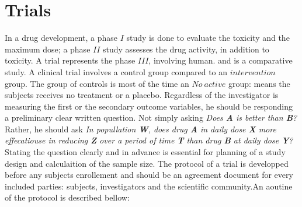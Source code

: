 \documentclass[final, paper=letter,5p,times,twocolumn]{elsarticle}
\theoremstyle{definition}
\begin{document}
\section{Trials}

In a drug development, a phase $I$ study is done to evaluate the toxicity and the maximum dose; a phase $II$ study assesses the drug activity, in addition to toxicity. A trial represents the phase $III$, involving human. and is a comparative study. A clinical trial involves a control group compared to an $intervention$ group. The group of controls is most of the time an $No~active$ group: means the subjects receives no treatment or a placebo. Regardless of the investigator is measuring the first or the secondary outcome variables, he should be responding a preliminary clear written question. Not simply asking {\it Does {\bf A} is better than {\bf B}?} Rather, he should ask {\it In popullation {\bf W}, does drug {\bf A} in daily dose {\bf X} more effecatiouse in reducing {\bf Z} over a period of time {\bf T} than drug {\bf B} at daily dose {\bf Y}?} Stating the question clearly and in advance is essential for planning of a study design and calculaition of the sample size.
The protocol of a trial is developped before any subjects enrollement and should be an agreement document for every included parties: subjects, investigators and the scientific community.An aoutine of the protocol is described bellow:
\end{document}
